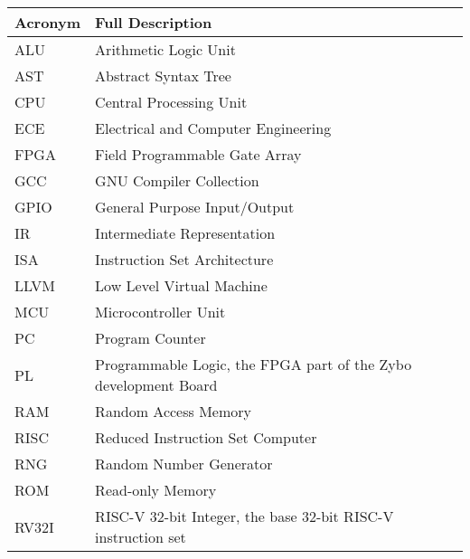\begin{table}[H]
	\begin{tabularx}{\textwidth}{| a | x |}
		\hline
		\textbf{Acronym} & \textbf{Full Description}                                       \\
		\hline

		ALU              & Arithmetic Logic Unit                                           \\
		AST              & Abstract Syntax Tree                                            \\
		CPU              & Central Processing Unit                                         \\
		ECE              & Electrical and Computer Engineering                             \\
		FPGA             & Field Programmable Gate Array                                   \\
		GCC              & GNU Compiler Collection                                         \\
		GPIO             & General Purpose Input/Output                                    \\
		IR               & Intermediate Representation                                     \\
		ISA              & Instruction Set Architecture                                    \\
		LLVM             & Low Level Virtual Machine                                       \\
		MCU              & Microcontroller Unit                                            \\
		PC               & Program Counter                                                 \\
		PL               & Programmable Logic, the FPGA part of the Zybo development Board \\
		RAM              & Random Access Memory                                            \\
		RISC             & Reduced Instruction Set Computer                                \\
		RNG              & Random Number Generator                                         \\
		ROM              & Read-only Memory                                                \\
		RV32I            & RISC-V 32-bit Integer, the base 32-bit RISC-V instruction set   \\%

		\hline
	\end{tabularx}
\end{table}

